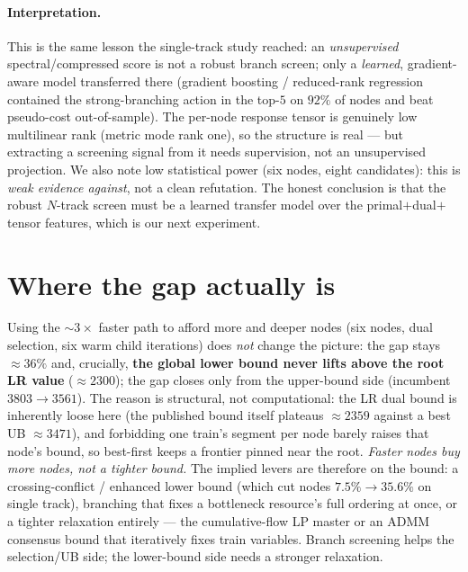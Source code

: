 \documentclass[11pt]{article}
\begin{document}
\paragraph{Interpretation.} This is the same lesson the single-track study reached: an
\emph{unsupervised} spectral/compressed score is not a robust branch screen; only a
\emph{learned}, gradient-aware model transferred there (gradient boosting / reduced-rank
regression contained the strong-branching action in the top-$5$ on $92\%$ of nodes and beat
pseudo-cost out-of-sample). The per-node response tensor is genuinely low multilinear rank
(metric mode rank one), so the structure is real --- but extracting a screening signal from it
needs supervision, not an unsupervised projection. We also note low statistical power (six
nodes, eight candidates): this is \emph{weak evidence against}, not a clean refutation. The
honest conclusion is that the robust $N$-track screen must be a learned transfer model over the
primal$+$dual$+$tensor features, which is our next experiment.

\section{Where the gap actually is}\label{sec:gap}
Using the $\sim\!3\times$ faster path to afford more and deeper nodes (six nodes, dual
selection, six warm child iterations) does \emph{not} change the picture: the gap stays
$\approx\!36\%$ and, crucially, \textbf{the global lower bound never lifts above the root LR
value} ($\approx\!2300$); the gap closes only from the upper-bound side (incumbent
$3803\!\to\!3561$). The reason is structural, not computational: the LR dual bound is
inherently loose here (the published bound itself plateaus $\approx\!2359$ against a best UB
$\approx\!3471$), and forbidding one train's segment per node barely raises that node's bound,
so best-first keeps a frontier pinned near the root. \emph{Faster nodes buy more nodes, not a
tighter bound.} The implied levers are therefore on the bound: a crossing-conflict / enhanced
lower bound (which cut nodes $7.5\%\!\to\!35.6\%$ on single track), branching that fixes a
bottleneck resource's full ordering at once, or a tighter relaxation entirely --- the
cumulative-flow LP master or an ADMM consensus bound that iteratively fixes train variables.
Branch screening helps the selection/UB side; the lower-bound side needs a stronger
relaxation.
\end{document}
